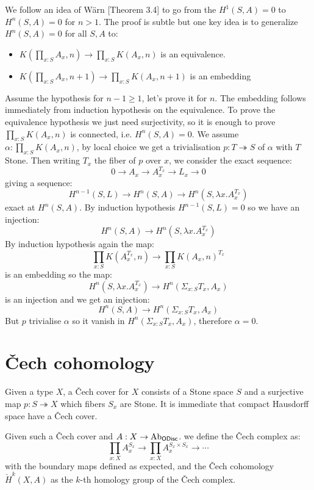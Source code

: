 \documentclass{../util/zariski}
\begin{document}
We follow an idea of Wärn \cite{cech-draft}[Theorem 3.4] to go from the $H^1(S,A)=0$ to $H^n(S,A)=0$ for $n>1$. The proof is subtle but one key idea is to generalize $H^n(S,A) = 0$ for all $S,A$ to: 
\begin{itemize}
\item $K(\prod_{x:S}A_x,n) \to \prod_{x:S}K(A_x,n)$ is an equivalence.
\item $K(\prod_{x:S}A_x,n+1) \to \prod_{x:S}K(A_x,n+1)$ is an embedding
\end{itemize}
Assume the hypothesis for $n-1\geq 1$, let's prove it for $n$. The embedding follows immediately from induction hypothesis on the equivalence. To prove the equivalence hypothesis we just need surjectivity, so it is enough to prove $\prod_{x:S}K(A_x,n)$ is connected, i.e. $H^n(S,A)=0$. We assume $\alpha:\prod_{x:S}K(A_x,n)$, by local choice we get a trivialisation $p:T\twoheadrightarrow S$ of $\alpha$ with $T$ Stone. Then writing $T_x$ the fiber of $p$ over $x$, we consider the exact sequence:
\[0\to A_x\to A_x^{T_x}\to L_x\to 0\]
giving a sequence:
\[H^{n-1}(S,L)\to H^n(S,A)\to H^n(S,\lambda x. A_x^{T_x})\]
exact at $H^n(S,A)$. By induction hypothesis $H^{n-1}(S,L) = 0$ so we have an injection:
\[H^n(S,A)\to H^n(S,\lambda x. A_x^{T_x})\]
By induction hypothesis again the map: 
\[\prod_{x:S}K(A_x^{T_x},n)\to \prod_{x:S}K(A_x,n)^{T_x}\]
is an embedding so the map:
\[H^n(S,\lambda x. A_x^{T_x}) \to H^n(\Sigma_{x:S}T_x,A_x)\]
is an injection and we get an injection:
\[H^n(S,A)\to H^n(\Sigma_{x:S}T_x,A_x)\] 
But $p$ trivialise $\alpha$ so it vanish in $H^n(\Sigma_{x:S}T_x,A_x)$, therefore $\alpha=0$.

\section{\v{C}ech cohomology}

Given a type $X$, a \v{C}ech cover for $X$ consists of a Stone space $S$ and a surjective map $p:S\twoheadrightarrow X$ which fibers $S_x$ are Stone. It is immediate that compact Hausdorff space have a \v{C}ech cover.

Given such a \v{C}ech cover and $A:X\to \mathrm{Ab}_{\mathsf{ODisc}}$. we define the \v{C}ech complex as:
\[\prod_{x:X}A_x^{S_x} \to \prod_{x:X}A_x^{S_x\times S_x} \to \cdots\]
with the boundary maps defined as expected, and the \v{C}ech cohomology $\check{H}^k(X,A)$ as the $k$-th homology group of the \v{C}ech complex.
\end{document}
